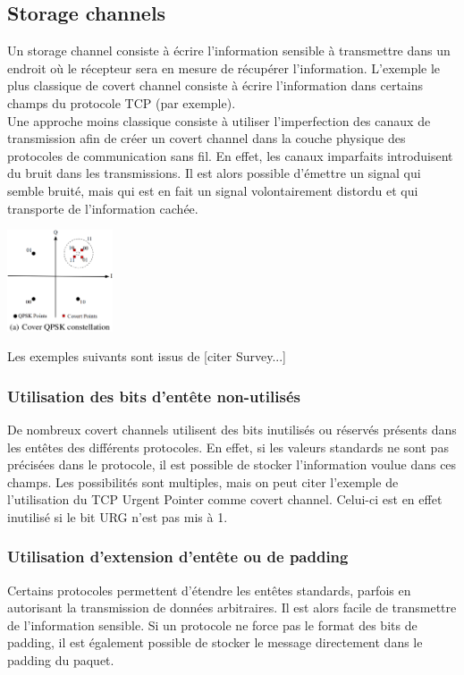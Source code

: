 \documentclass{acm_proc_article-sp}
\begin{document}
\subsection{Storage channels}
Un storage channel consiste à écrire l'information sensible à transmettre dans un endroit où le récepteur sera en mesure de récupérer l'information. L'exemple le plus classique de covert channel consiste à écrire l'information dans certains champs du protocole TCP (par exemple).\\
Une approche moins classique consiste à utiliser l'imperfection des canaux de transmission afin de créer un covert channel dans la couche physique des protocoles de communication sans fil. En effet, les canaux imparfaits introduisent du bruit dans les transmissions. Il est alors possible d'émettre un signal qui semble bruité, mais qui est en fait un signal volontairement distordu et qui transporte de l'information cachée.

\begin{center}
\includegraphics[height=3cm]{DirtyConstellation.eps}
\end{center}

Les exemples suivants sont issus de [citer Survey...]

\subsubsection{Utilisation des bits d'entête non-utilisés}
De nombreux covert channels utilisent des bits inutilisés ou réservés présents dans les entêtes des différents protocoles. En effet, si les valeurs standards ne sont pas précisées dans le protocole, il est possible de stocker l'information voulue dans ces champs. Les possibilités sont multiples, mais on peut citer l'exemple de l'utilisation du TCP Urgent Pointer comme covert channel. Celui-ci est en effet inutilisé si le bit URG n'est pas mis à 1.

\subsubsection{Utilisation d'extension d'entête ou de padding}
Certains protocoles permettent d'étendre les entêtes standards, parfois en autorisant la transmission de données arbitraires. Il est alors facile de transmettre de l'information sensible.
Si un protocole ne force pas le format des bits de padding, il est également possible de stocker le message directement dans le padding du paquet.
\end{document}
